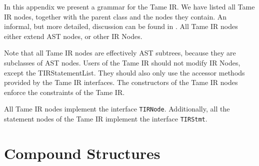 In this appendix we present a grammar for the Tame IR.
We have listed all Tame IR nodes, together with the
parent class and the nodes they contain. An informal, but
more detailed, discussion can be found in .
All Tame IR nodes either extend AST nodes, or other IR Nodes.

Note that all Tame IR nodes are effectively AST subtrees,
because they are subclasses of AST nodes. Users of the 
Tame IR should not modify IR Nodes, except the
TIRStatementList. They should also only use the accessor
methods provided by the Tame IR interfaces. The constructors
of the Tame IR nodes enforce the constraints of the Tame IR.

All Tame IR nodes implement the interface {\tt TIRNode}.
Additionally, all the statement nodes of the Tame IR
implement the interface {\tt TIRStmt}.




\section{Compound Structures}

